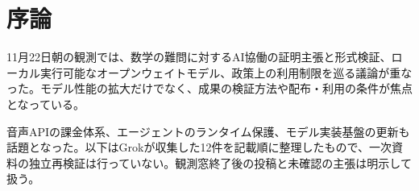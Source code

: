 \section{序論}
11月22日朝の観測では、数学の難問に対するAI協働の証明主張と形式検証、ローカル実行可能なオープンウェイトモデル、政策上の利用制限を巡る議論が重なった。モデル性能の拡大だけでなく、成果の検証方法や配布・利用の条件が焦点となっている。

音声APIの課金体系、エージェントのランタイム保護、モデル実装基盤の更新も話題となった。以下はGrokが収集した12件を記載順に整理したもので、一次資料の独立再検証は行っていない。観測窓終了後の投稿と未確認の主張は明示して扱う。

